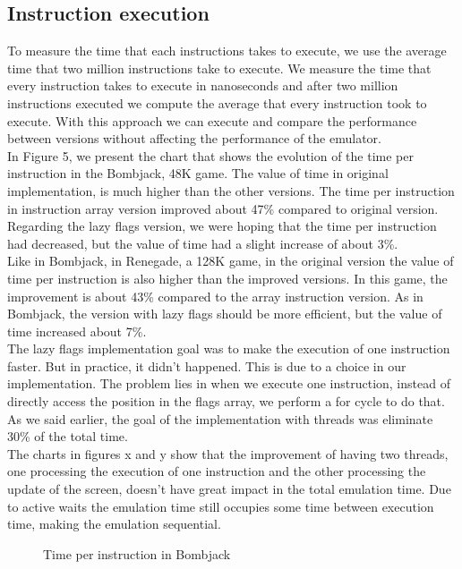 \subsection{Instruction execution}
To measure the time that each instructions takes to execute, we use the average time that two million instructions take to execute. We measure the time that every instruction takes to execute in nanoseconds and after two million instructions executed we compute the average that every instruction took to execute. With this approach we can execute and compare the performance between versions without affecting the performance of the emulator.\\
\indent In Figure 5, we present the chart that shows the evolution of the time per instruction in the Bombjack, 48K game. The value of time in original implementation, is much higher than the other versions. The time per instruction in instruction array version improved about 47\% compared to original version. Regarding the lazy flags version, we were hoping that the time per instruction had decreased, but the value of time had a slight increase of about 3\%.\\
\indent Like in Bombjack, in Renegade, a 128K game, in the original version the value of time per instruction is also higher than the improved versions. In this game, the improvement is about 43\% compared to the array instruction version. As in Bombjack, the version with lazy flags should be more efficient, but the value of time increased about 7\%.\\
\indent The lazy flags implementation goal was to make the execution of one instruction faster. But in practice, it didn't happened. This is due to a choice in our implementation. The problem lies in when we execute one instruction, instead of directly access the position in the flags array, we perform a for cycle to do that.\\
\indent As we said earlier, the goal of the implementation with threads was eliminate 30\% of the total time.\\
\indent The charts in figures x and y show that the improvement of having two threads, one processing the execution of one instruction and the other processing the update of the screen, doesn't have great impact in the total emulation time. Due to active waits the emulation time still occupies some time between execution time, making the emulation sequential.
\begin{figure}
	\caption{Time per instruction in Bombjack}
\end{figure}
